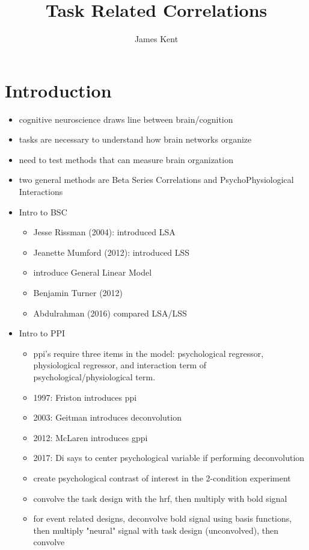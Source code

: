 \documentclass[phd,appendix,figures]{uithesis}
\title{Task Related Correlations}
\author{James Kent}
\begin{document}
\frontmatter
\chapter{Introduction}

\begin{itemize}
	\item cognitive neuroscience draws line between brain/cognition
	\item tasks are necessary to understand how brain networks organize
	\item need to test methods that can measure brain organization
	\item two general methods are Beta Series Correlations and PsychoPhysiological Interactions
	\item Intro to BSC
	\begin{itemize}
		\item Jesse Rissman (2004): introduced LSA
		\item Jeanette Mumford (2012): introduced LSS
		\item introduce General Linear Model
		\item Benjamin Turner (2012)
		\item Abdulrahman (2016) compared LSA/LSS
	\end{itemize}
	\item Intro to PPI
	\begin{itemize}
		\item ppi's require three items in the model: psychological regressor, physiological regressor, and
		      interaction term of psychological/physiological term.
		\item 1997: Friston introduces ppi
		\item 2003: Geitman introduces deconvolution
		\item 2012: McLaren introduces gppi
		\item 2017: Di says to center psychological variable if performing deconvolution
		\item create psychological contrast of interest in the 2-condition experiment
		\item convolve the task design with the hrf, then multiply with bold signal
		\item for event related designs, deconvolve bold signal using basis functions,
			then multiply "neural" signal with task design (unconvolved), then convolve

\end{itemize}
\end{itemize}
\end{document}
